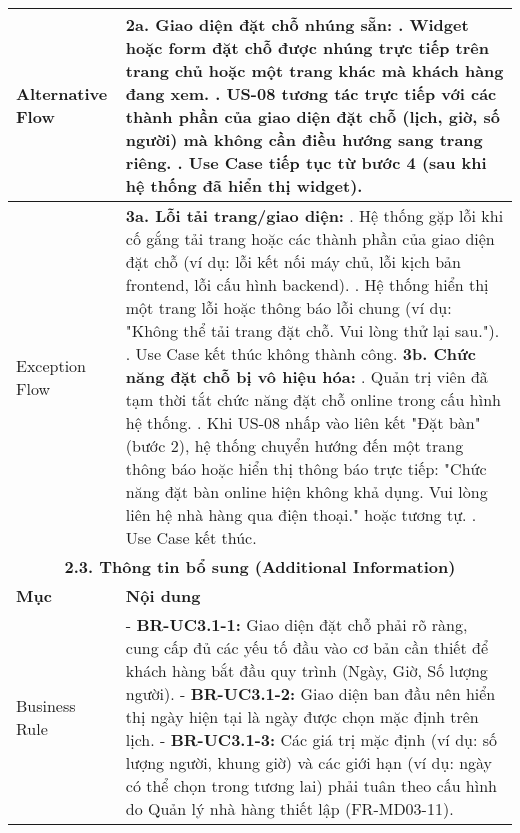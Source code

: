 \begin{longtable}{|m{4cm}|p{11cm}|}
\hline
Alternative Flow & \textbf{2a. Giao diện đặt chỗ nhúng sẵn:} \newline    1. Widget hoặc form đặt chỗ được nhúng trực tiếp trên trang chủ hoặc một trang khác mà khách hàng đang xem. \newline    2. US-08 tương tác trực tiếp với các thành phần của giao diện đặt chỗ (lịch, giờ, số người) mà không cần điều hướng sang trang riêng. \newline    3. Use Case tiếp tục từ bước 4 (sau khi hệ thống đã hiển thị widget). \\
\hline
Exception Flow & \textbf{3a. Lỗi tải trang/giao diện:} \newline    1. Hệ thống gặp lỗi khi cố gắng tải trang hoặc các thành phần của giao diện đặt chỗ (ví dụ: lỗi kết nối máy chủ, lỗi kịch bản frontend, lỗi cấu hình backend). \newline    2. Hệ thống hiển thị một trang lỗi hoặc thông báo lỗi chung (ví dụ: "Không thể tải trang đặt chỗ. Vui lòng thử lại sau."). \newline    3. Use Case kết thúc không thành công. \newline \textbf{3b. Chức năng đặt chỗ bị vô hiệu hóa:} \newline    1. Quản trị viên đã tạm thời tắt chức năng đặt chỗ online trong cấu hình hệ thống. \newline    2. Khi US-08 nhấp vào liên kết "Đặt bàn" (bước 2), hệ thống chuyển hướng đến một trang thông báo hoặc hiển thị thông báo trực tiếp: "Chức năng đặt bàn online hiện không khả dụng. Vui lòng liên hệ nhà hàng qua điện thoại." hoặc tương tự. \newline    3. Use Case kết thúc. \\
\hline
\multicolumn{2}{|c|}{\textbf{2.3. Thông tin bổ sung (Additional Information)}} \\
\hline
\textbf{Mục} & \textbf{Nội dung} \\
\hline
Business Rule & - \textbf{BR-UC3.1-1:} Giao diện đặt chỗ phải rõ ràng, cung cấp đủ các yếu tố đầu vào cơ bản cần thiết để khách hàng bắt đầu quy trình (Ngày, Giờ, Số lượng người). \newline - \textbf{BR-UC3.1-2:} Giao diện ban đầu nên hiển thị ngày hiện tại là ngày được chọn mặc định trên lịch. \newline - \textbf{BR-UC3.1-3:} Các giá trị mặc định (ví dụ: số lượng người, khung giờ) và các giới hạn (ví dụ: ngày có thể chọn trong tương lai) phải tuân theo cấu hình do Quản lý nhà hàng thiết lập (FR-MD03-11). \\

\end{longtable}
